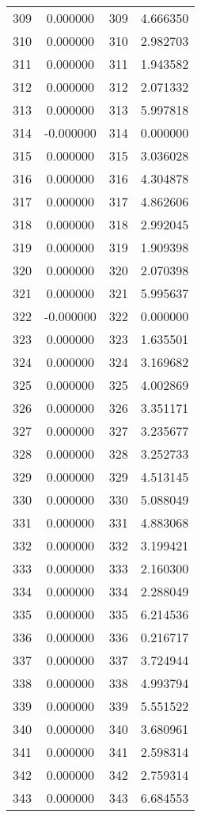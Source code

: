 \documentclass[12pt]{article}
\begin{document}
\begin{longtable}{@{}cccc@{}}
309 & 0.000000 & 309 & 4.666350 \\
310 & 0.000000 & 310 & 2.982703 \\
311 & 0.000000 & 311 & 1.943582 \\
312 & 0.000000 & 312 & 2.071332 \\
313 & 0.000000 & 313 & 5.997818 \\
314 & -0.000000 & 314 & 0.000000 \\
315 & 0.000000 & 315 & 3.036028 \\
316 & 0.000000 & 316 & 4.304878 \\
317 & 0.000000 & 317 & 4.862606 \\
318 & 0.000000 & 318 & 2.992045 \\
319 & 0.000000 & 319 & 1.909398 \\
320 & 0.000000 & 320 & 2.070398 \\
321 & 0.000000 & 321 & 5.995637 \\
322 & -0.000000 & 322 & 0.000000 \\
323 & 0.000000 & 323 & 1.635501 \\
324 & 0.000000 & 324 & 3.169682 \\
325 & 0.000000 & 325 & 4.002869 \\
326 & 0.000000 & 326 & 3.351171 \\
327 & 0.000000 & 327 & 3.235677 \\
328 & 0.000000 & 328 & 3.252733 \\
329 & 0.000000 & 329 & 4.513145 \\
330 & 0.000000 & 330 & 5.088049 \\
331 & 0.000000 & 331 & 4.883068 \\
332 & 0.000000 & 332 & 3.199421 \\
333 & 0.000000 & 333 & 2.160300 \\
334 & 0.000000 & 334 & 2.288049 \\
335 & 0.000000 & 335 & 6.214536 \\
336 & 0.000000 & 336 & 0.216717 \\
337 & 0.000000 & 337 & 3.724944 \\
338 & 0.000000 & 338 & 4.993794 \\
339 & 0.000000 & 339 & 5.551522 \\
340 & 0.000000 & 340 & 3.680961 \\
341 & 0.000000 & 341 & 2.598314 \\
342 & 0.000000 & 342 & 2.759314 \\
343 & 0.000000 & 343 & 6.684553 \\

\end{longtable}
\end{document}

